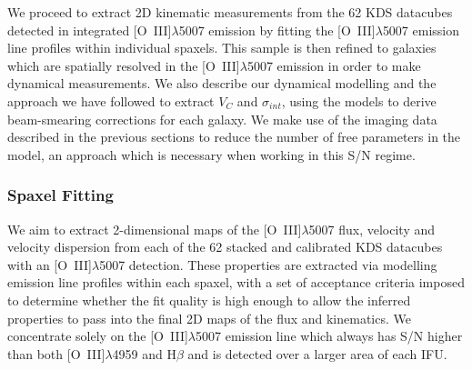 \documentclass[fleqn,usenatbib]{mn2e}
\begin{document}
We proceed to extract 2D kinematic measurements from the 62 KDS datacubes detected in integrated [O~{\sc III}]$\lambda$5007 emission by fitting the [O~{\sc III}]$\lambda$5007 emission line profiles within individual spaxels.
This sample is then refined to galaxies which are spatially resolved in the [O~{\sc III}]$\lambda$5007 emission in order to make dynamical measurements.
We also describe our dynamical modelling and the approach we have followed to extract $V_{C}$ and $\sigma_{int}$, using the models to derive beam-smearing corrections for each galaxy.
We make use of the imaging data described in the previous sections to reduce the number of free parameters in the model, an approach which is necessary when working in this S/N regime.  

\subsubsection{Spaxel Fitting}\label{subsubsection:spaxel_fitting}
We aim to extract 2-dimensional maps of the [O~{\sc III}]$\lambda$5007 flux, velocity and velocity dispersion from each of the 62 stacked and calibrated KDS datacubes with an [O~{\sc III}]$\lambda$5007 detection.
These properties are extracted via modelling emission line profiles within each spaxel, with a set of acceptance criteria imposed to determine whether the fit quality is high enough to allow the inferred properties to pass into the final 2D maps of the flux and kinematics.
We concentrate solely on the [O~{\sc III}]$\lambda$5007 emission line which always has S/N higher than both [O~{\sc III}]$\lambda$4959 and H$\beta$ and is detected over a larger area of each IFU. \\
\end{document}
